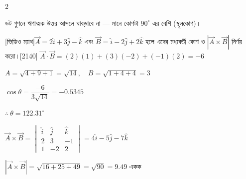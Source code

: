 \documentclass[11pt]{article}
\begin{document}
\begin{multicols}{2}
\begin{tipbox}[2010]
ডট গুণনে ঋণাত্মক উত্তর আসলে ঘাবড়াবে না — মানে কোণটা $90^\circ$ এর বেশি (স্থূলকোণ)।
\end{tipbox}

[ভিডিও ম্যাথ]{$\vec A=2\hat i+3\hat j-\hat k$ এবং $\vec B=\hat i-2\hat j+2\hat k$ হলে এদের মধ্যবর্তী কোণ ও $|\vec A\times\vec B|$ নির্ণয় করো।}[2140]
\solhead
$\vec A\cdot\vec B=(2)(1)+(3)(-2)+(-1)(2)=-6$\par
$A=\sqrt{4+9+1}=\sqrt{14},\quad B=\sqrt{1+4+4}=3$\par
$\cos\theta=\dfrac{-6}{3\sqrt{14}}=-0.5345$\par
$\therefore\ \theta=122.31^\circ$ \Ans\par\vspace{2pt}
$\vec A\times\vec B=\begin{vmatrix}\hat i&\hat j&\hat k\\2&3&-1\\1&-2&2\end{vmatrix}=4\hat i-5\hat j-7\hat k$\par
$|\vec A\times\vec B|=\sqrt{16+25+49}=\sqrt{90}=9.49$ একক \Ans
\end{multicols}
\end{document}
